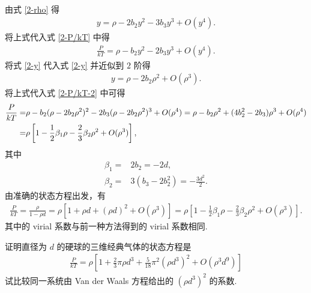 \documentclass{assignment}
\begin{document}
\begin{sol}
\begin{align}
    \end{align}
    由式 \eqref{2-rho} 得
    \begin{align}
        \label{2-y}
        y=\rho-2b_2y^2-3b_3y^3+O(y^4).
    \end{align}
    将上式代入式 \eqref{2-P/kT} 中得
    \begin{align}
        \label{2-P/kT-2}
        \frac{P}{kT}=\rho-b_2y^2-2b_3y^3+O(y^4).
    \end{align}
    将式 \eqref{2-y} 代入式 \eqref{2-y} 并近似到 $2$ 阶得
    \begin{align}
        y=\rho-2b_2\rho^2+O(\rho^3).
    \end{align}
    将上式代入式 \eqref{2-P/kT-2} 中可得
    \begin{align}
        \notag\frac{P}{kT}=&\rho-b_2(\rho-2b_2\rho^2)^2-2b_3(\rho-2b_2\rho^2)^3+O(\rho^4)=\rho-b_2\rho^2+(4b_2^2-2b_3)\rho^3+O(\rho^4)\\
        =&\rho\left[1-\frac{1}{2}\beta_1\rho-\frac{2}{3}\beta_2\rho^2+O(\rho^3)\right],
    \end{align}
    其中
    \begin{align}
        \beta_1=&2b_2=-2d,\\
        \beta_2=&3(b_3-2b_2^2)=-\frac{3d^2}{2}.
    \end{align}
    由准确的状态方程出发，有
    \begin{align}
        \frac{P}{kT}=\frac{\rho}{1-\rho d}=\rho\left[1+\rho d+(\rho d)^2+O(\rho^3)\right]=\rho\left[1-\frac{1}{2}\beta_1\rho-\frac{2}{3}\beta_2\rho^2+O(\rho^3)\right].
    \end{align}
    其中的 virial 系数与前一种方法得到的 virial 系数相同.
\end{sol}

\begin{prob}
    证明直径为 $d$ 的硬球的三维经典气体的状态方程是
    \begin{align}
        \frac{P}{kT}=\rho\left[1+\frac{2}{3}\pi\rho d^3+\frac{5}{18}\pi^2(\rho d^3)^2+O(\rho^3d^9)\right]
    \end{align}
    试比较同一系统由 Van der Waals 方程给出的 $(\rho d^3)^2$ 的系数.
\end{prob}
\begin{pf}

\end{pf}
\end{document}
